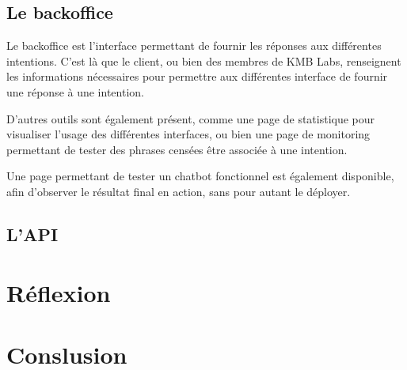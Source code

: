 \documentclass[12pt,a4paper,twoside]{scrreprt}
\begin{document}
\section{Le backoffice}

Le backoffice est l'interface permettant de fournir les réponses aux différentes intentions. C'est là que le client, ou bien des membres de KMB Labs, renseignent les informations nécessaires pour permettre aux différentes interface de fournir une réponse à une intention.

D'autres outils sont également présent, comme une page de statistique pour visualiser l'usage des différentes interfaces, ou bien une page de monitoring permettant de tester des phrases censées être associée à une intention.

Une page permettant de tester un chatbot fonctionnel est également disponible, afin d'observer le résultat final en action, sans pour autant le déployer.

\section{L'API}

\chapter{Réflexion}

\chapter{Conslusion}
\end{document}
